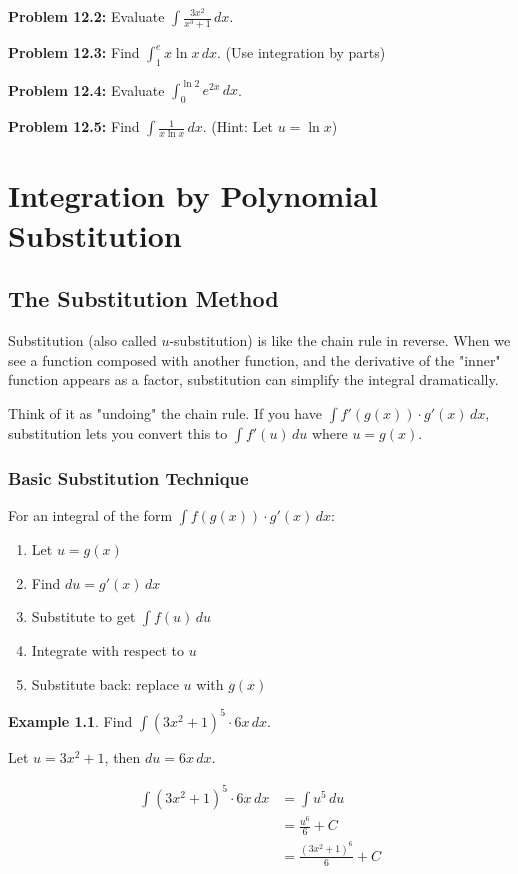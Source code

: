 \documentclass[12pt,a4paper]{book}
\theoremstyle{definition}
\newtheorem{example}{Example}[chapter]
\begin{document}
\textbf{Problem 12.2:} Evaluate $\int \frac{3x^2}{x^3 + 1} \, dx$.

\textbf{Problem 12.3:} Find $\int_1^e x \ln x \, dx$. (Use integration by parts)

\textbf{Problem 12.4:} Evaluate $\int_0^{\ln 2} e^{2x} \, dx$.

\textbf{Problem 12.5:} Find $\int \frac{1}{x \ln x} \, dx$. (Hint: Let $u = \ln x$)

\chapter{Integration by Polynomial Substitution}

\section{The Substitution Method}

\begin{intuition}
Substitution (also called $u$-substitution) is like the chain rule in reverse. When we see a function composed with another function, and the derivative of the "inner" function appears as a factor, substitution can simplify the integral dramatically.

Think of it as "undoing" the chain rule. If you have $\int f'(g(x)) \cdot g'(x) \, dx$, substitution lets you convert this to $\int f'(u) \, du$ where $u = g(x)$.
\end{intuition}

\subsection{Basic Substitution Technique}

\begin{keyformula}
For an integral of the form $\int f(g(x)) \cdot g'(x) \, dx$:
\begin{enumerate}
    \item Let $u = g(x)$
    \item Find $du = g'(x) \, dx$
    \item Substitute to get $\int f(u) \, du$
    \item Integrate with respect to $u$
    \item Substitute back: replace $u$ with $g(x)$
\end{enumerate}
\end{keyformula}

\begin{example}
Find $\int (3x^2 + 1)^5 \cdot 6x \, dx$.

Let $u = 3x^2 + 1$, then $du = 6x \, dx$.

\begin{align}
\int (3x^2 + 1)^5 \cdot 6x \, dx &= \int u^5 \, du\\
&= \frac{u^6}{6} + C\\
&= \frac{(3x^2 + 1)^6}{6} + C
\end{align}
\end{example}
\end{document}
